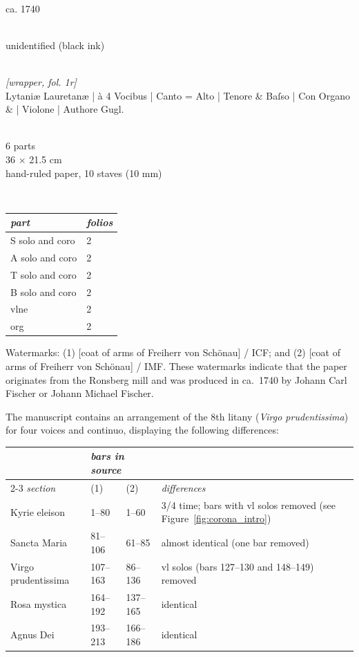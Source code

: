 \documentclass[abbrwidth=7em,shorttitlesize=55]{ees}
\begin{document}
\\
ca. 1740

\\
unidentified (black ink)

\\
\textit{[wrapper, fol. 1r]}\\
Lytaniæ Lauretanæ | à 4 Vocibus | Canto = Alto | Tenore \& Baſso | Con Organo \& | Violone | Authore Gugl.

\\
6 parts\\
36 × 21.5 cm\\
hand-ruled paper, 10 staves (10 mm)

\\[1ex]
\begin{tabular}{ll}
  \toprule
  \itshape part & \itshape folios \\
  \midrule
  S solo and coro & 2 \\
  A solo and coro & 2 \\
  T solo and coro & 2 \\
  B solo and coro & 2 \\
  vlne            & 2 \\
  org             & 2 \\
  \bottomrule
\end{tabular}

Watermarks: (1) [coat of arms of Freiherr von Schönau] / ICF; and (2) [coat of arms of Freiherr von Schönau] / IMF. These watermarks indicate that the paper originates from the Ronsberg mill and was produced in ca.~1740 by Johann Carl Fischer or Johann Michael Fischer.

The manuscript contains an arrangement of the 8th litany (\textit{Virgo prudentissima}) for four voices and continuo, displaying the following differences:

\begin{tabularx}{\textwidth}{lllX}
  \toprule
  & \multicolumn{2}{l}{\itshape bars in source} \\
  \cmidrule{2-3}
  \itshape section & (1) & (2) & \itshape differences \\
  \midrule
  Kyrie eleison & 1–80 & 1–60 & 3/4 time; bars with vl solos removed (see Figure~\ref{fig:corona_intro}) \\
  Sancta Maria & 81–106 & 61–85 & almost identical (one bar removed) \\
  Virgo prudentissima & 107–163 & 86–136 & vl solos (bars 127–130 and 148–149) removed \\
  Rosa mystica & 164–192 & 137–165 & identical \\
  Agnus Dei & 193–213 & 166–186 & identical \\
  \bottomrule
\end{tabularx}
\end{document}
